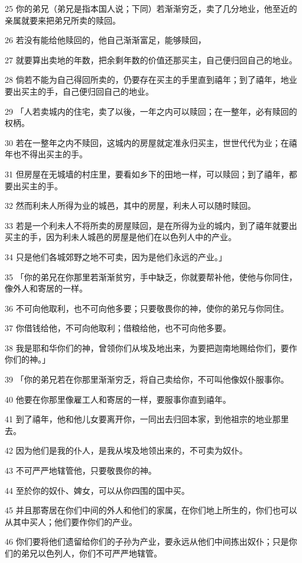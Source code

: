 \par 25 你的弟兄（弟兄是指本国人说；下同）若渐渐穷乏，卖了几分地业，他至近的亲属就要来把弟兄所卖的赎回。
\par 26 若没有能给他赎回的，他自己渐渐富足，能够赎回，
\par 27 就要算出卖地的年数，把余剩年数的价值还那买主，自己便归回自己的地业。
\par 28 倘若不能为自己得回所卖的，仍要存在买主的手里直到禧年；到了禧年，地业要出买主的手，自己便归回自己的地业。
\par 29 「人若卖城内的住宅，卖了以後，一年之内可以赎回；在一整年，必有赎回的权柄。
\par 30 若在一整年之内不赎回，这城内的房屋就定准永归买主，世世代代为业；在禧年也不得出买主的手。
\par 31 但房屋在无城墙的村庄里，要看如乡下的田地一样，可以赎回；到了禧年，都要出买主的手。
\par 32 然而利未人所得为业的城邑，其中的房屋，利未人可以随时赎回。
\par 33 若是一个利未人不将所卖的房屋赎回，是在所得为业的城内，到了禧年就要出买主的手，因为利未人城邑的房屋是他们在以色列人中的产业。
\par 34 只是他们各城郊野之地不可卖，因为是他们永远的产业。」
\par 35 「你的弟兄在你那里若渐渐贫穷，手中缺乏，你就要帮补他，使他与你同住，像外人和寄居的一样。
\par 36 不可向他取利，也不可向他多要；只要敬畏你的神，使你的弟兄与你同住。
\par 37 你借钱给他，不可向他取利；借粮给他，也不可向他多要。
\par 38 我是耶和华你们的神，曾领你们从埃及地出来，为要把迦南地赐给你们，要作你们的神。」
\par 39 「你的弟兄若在你那里渐渐穷乏，将自己卖给你，不可叫他像奴仆服事你。
\par 40 他要在你那里像雇工人和寄居的一样，要服事你直到禧年。
\par 41 到了禧年，他和他儿女要离开你，一同出去归回本家，到他祖宗的地业那里去。
\par 42 因为他们是我的仆人，是我从埃及地领出来的，不可卖为奴仆。
\par 43 不可严严地辖管他，只要敬畏你的神。
\par 44 至於你的奴仆、婢女，可以从你四围的国中买。
\par 45 并且那寄居在你们中间的外人和他们的家属，在你们地上所生的，你们也可以从其中买人；他们要作你们的产业。
\par 46 你们要将他们遗留给你们的子孙为产业，要永远从他们中间拣出奴仆；只是你们的弟兄以色列人，你们不可严严地辖管。
